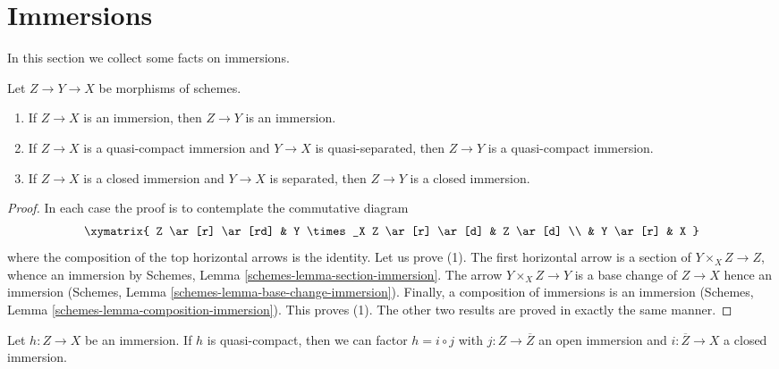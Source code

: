 \section{Immersions}
\label{section-immersions}

\noindent
In this section we collect some facts on immersions.

\begin{lemma}
\label{lemma-immersion-permanence}
Let $Z \to Y \to X$ be morphisms of schemes.
\begin{enumerate}
\item If $Z \to X$ is an immersion, then $Z \to Y$ is an immersion.
\item If $Z \to X$ is a quasi-compact immersion and $Y \to X$ is
quasi-separated, then $Z \to Y$ is a quasi-compact immersion.
\item If $Z \to X$ is a closed immersion and $Y \to X$ is separated,
then $Z \to Y$ is a closed immersion.
\end{enumerate}
\end{lemma}

\begin{proof}
In each case the proof is to contemplate the commutative diagram
$$
\xymatrix{
Z \ar[r] \ar[rd] & Y \times_X Z \ar[r] \ar[d] & Z \ar[d] \\
& Y \ar[r] & X
}
$$
where the composition of the top horizontal arrows is the identity.
Let us prove (1). The first horizontal arrow is a section of
$Y \times_X Z \to Z$, whence an immersion by
Schemes, Lemma \ref{schemes-lemma-section-immersion}.
The arrow $Y \times_X Z \to Y$ is a base change of $Z \to X$ hence
an immersion (Schemes, Lemma \ref{schemes-lemma-base-change-immersion}).
Finally, a composition of immersions is an immersion
(Schemes, Lemma \ref{schemes-lemma-composition-immersion}). This proves (1).
The other two results are proved in exactly the same manner.
\end{proof}

\begin{lemma}
\label{lemma-factor-quasi-compact-immersion}
Let $h : Z \to X$ be an immersion.
If $h$ is quasi-compact, then we can factor
$h = i \circ j$ with $j : Z \to \overline{Z}$ an
open immersion and $i : \overline{Z} \to X$ a closed immersion.
\end{lemma}

